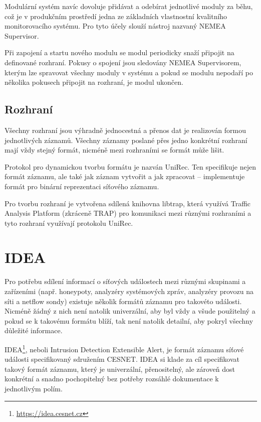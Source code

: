 Modulární systém navíc dovoluje přidávat a odebírat jednotlivé moduly za běhu, což je v produkčním prostředí jedna ze základních vlastnostní kvalitního monitorovacího systému. Pro tyto účely slouží nástroj nazvaný NEMEA Supervisor.

Při zapojení a startu nového modulu se modul periodicky snaží připojit na definované rozhraní. Pokusy o spojení jsou sledovány NEMEA Supervisorem, kterým lze spravovat všechny moduly v systému a pokud se modulu nepodaří po několika pokusech připojit na rozhraní, je modul ukončen.

\subsection{Rozhraní}

Všechny rozhraní jsou výhradně jednocestná a přenos dat je realizován formou jednotlivých záznamů. Všechny záznamy poslané přes jedno konkrétní rozhraní mají vždy stejný formát, nicméně mezi rozhraními se formát může lišit. 

Protokol pro dynamickou tvorbu formátu je nazván UniRec. Ten specifikuje nejen formát záznamu, ale také jak záznam vytvořit a jak zpracovat -- implementuje formát pro binární reprezentaci síťového záznamu.

Pro tvorbu rozhraní je vytvořena sdílená knihovna libtrap, která využívá Traffic Analysis Platform (zkráceně TRAP) pro komunikaci mezi různými rozhraními a tyto rozhraní využívají protokolu UniRec.

\section{IDEA}
\label{sec:idea}

Pro potřebu sdílení informací o síťových událostech mezi různými skupinami a zařízeními (např. honeypoty, analyzéry systémových zpráv, analyzéry provozu na síti a netflow sondy) existuje několik formátů záznamu pro takovéto události. Nicméně žádný z nich není natolik univerzální, aby byl vždy a všude použitelný a pokud se k takovému formátu blíží, tak není natolik detailní, aby pokryl všechny důležité informace.

IDEA\footnote{\url{https://idea.cesnet.cz}}, neboli Intrusion Detection Extensible Alert, je formát záznamu síťové události specifikovaný sdružením CESNET. IDEA si klade za cíl specifikovat takový formát záznamu, který je univerzální, přenositelný, ale zároveň dost konkrétní a snadno pochopitelný bez potřeby rozsáhlé dokumentace k jednotlivým polím.

